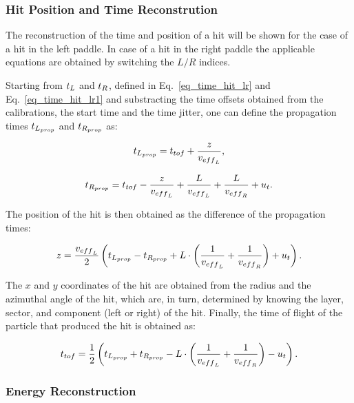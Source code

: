 \documentclass{elsart}
\begin{document}
\subsubsection{Hit Position and Time Reconstrution}

The reconstruction of the time and position of a hit will be shown for the case of a hit in the left paddle. In
case of a hit in the right paddle the applicable equations are obtained by switching the $L/R$ indices.

Starting from $t_{\rm{L}}$ and $t_{\rm{R}}$, defined in Eq.~\ref{eq_time_hit_lr} and Eq.~\ref{eq_time_hit_lr1}
and substracting the time offsets obtained from the calibrations, the start time and the time jitter, one can
define the propagation times $t_{\rm{L}_{\rm{prop}}}$ and $t_{\rm{R}_{\rm{prop}}}$ as:

\begin{equation}
t_{\rm{L}_{\rm{prop}}}=t_{\rm{tof}}+\frac{z}{v_{\rm{eff}_{\rm{L}}}},
\end{equation}

\begin{equation}
t_{\rm{R}_{\rm{prop}}}=t_{\rm{tof}}-\frac{z}{v_{\rm{eff}_{\rm{L}}}}+\frac{L}{v_{\rm{eff}_{\rm{L}}}}
+\frac{L}{v_{\rm{eff}_{\rm{R}}}}+u_{\rm{t}}.
\end{equation}

The position of the hit is then obtained as the difference of the propagation times:

\begin{equation}
z=\frac{v_{\rm{eff}_{\rm{L}}}}{2} \left(t_{\rm{L}_{\rm{prop}}}-t_{\rm{R}_{\rm{prop}}}
+ L \cdot \left(\frac{1}{v_{\rm{eff}_{\rm{L}}}}+\frac{1}{v_{\rm{eff}_{\rm{R}}}}\right)  +u_{\rm{t}}\right).
\end{equation}

The $x$ and $y$ coordinates of the hit are obtained from the radius and the azimuthal angle of the hit, which
are, in turn, determined by knowing the layer, sector, and component (left or right) of the hit.  Finally, the time
of flight of the particle that produced the hit is obtained as:

\begin{equation}
t_{\rm{tof}}= \frac{1}{2}\left(t_{\rm{L}_{\rm{prop}}}+t_{\rm{R}_{\rm{prop}}}- L \cdot \left(\frac{1}{v_{\rm{eff}_{\rm{L}}}}
+\frac{1}{v_{\rm{eff}_{\rm{R}}}}\right)  -u_{\rm{t}}\right).
\end{equation}

\subsubsection{Energy Reconstruction}
\end{document}
